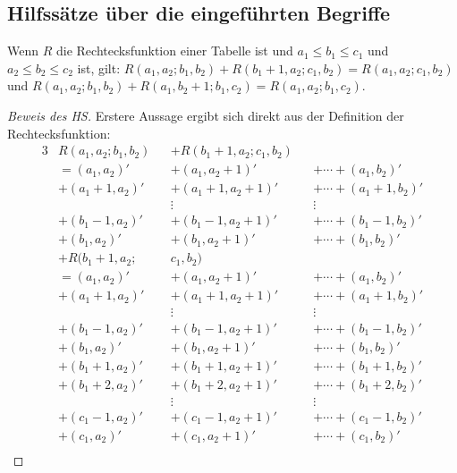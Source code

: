 \subsection*{Hilfssätze über die eingeführten Begriffe}

\renewcommand{\qedsymbol}{$\square$}

\begin{lem}\label{r_summe}
    Wenn $R$ die Rechtecksfunktion einer Tabelle ist und $a_1\leq b_1\leq c_1$ und $a_2\leq b_2\leq c_2$ ist, gilt: 
    $R(a_1, a_2; b_1, b_2)+R(b_1+1, a_2; c_1, b_2)=R(a_1, a_2; c_1, b_2)$ und 
    $R(a_1, a_2; b_1, b_2)+R(a_1, b_2+1; b_1, c_2)=R(a_1, a_2; b_1, c_2)$.
\end{lem}
\begin{proof}[Beweis des HS]
    Erstere Aussage ergibt sich direkt aus der Definition der Rechtecksfunktion:
    \begin{alignat*}{3}
        &R(a_1, a_2; b_1, b_2)&& +R(b_1+1, a_2; c_1, b_2)&&\\
        &=(a_1, a_2)' &&+ (a_1, a_2+1)' &&+\cdots+ (a_1, b_2)'\\
        &+(a_1+1, a_2)' &&+ (a_1+1, a_2+1)' &&+\cdots+ (a_1+1, b_2)'\\
        & &&\vdots\quad\quad\quad\quad&&\vdots\\
        &+(b_1-1, a_2)' &&+ (b_1-1, a_2+1)' &&+\cdots + (b_1-1, b_2)'\\
        &+(b_1, a_2)' &&+ (b_1, a_2+1)' &&+ \cdots + (b_1, b_2)'\\
        &+R(b_1+1, a_2; &&c_1, b_2) &&\\
        &=(a_1, a_2)' &&+ (a_1, a_2+1)' &&+\cdots+ (a_1, b_2)'\\
        &+(a_1+1, a_2)' &&+ (a_1+1, a_2+1)' &&+\cdots+ (a_1+1, b_2)'\\
        & &&\vdots\quad\quad\quad\quad&&\vdots\\
        &+(b_1-1, a_2)' &&+ (b_1-1, a_2+1)' &&+\cdots + (b_1-1, b_2)'\\
        &+(b_1, a_2)' &&+ (b_1, a_2+1)' &&+ \cdots + (b_1, b_2)'\\
        &+(b_1+1, a_2)' &&+ (b_1+1, a_2+1)' &&+\cdots+ (b_1+1, b_2)'\\
        &+(b_1+2, a_2)' &&+ (b_1+2, a_2+1)' &&+\cdots+ (b_1+2, b_2)'\\
        & &&\vdots\quad\quad\quad\quad&&\vdots\\
        &+(c_1-1, a_2)' &&+ (c_1-1, a_2+1)' &&+\cdots + (c_1-1, b_2)'\\
        &+(c_1, a_2)' &&+ (c_1, a_2+1)' &&+ \cdots + (c_1, b_2)'\\

\end{alignat*}
\end{proof}
